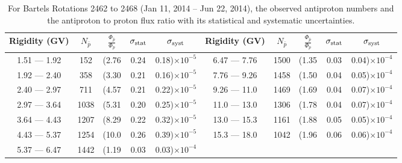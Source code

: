 \begin{table}[p] 
\renewcommand\baselinestretch{1.3}\selectfont
\setlength\tabcolsep{3pt}
\centering
\begin{tabular}{ccccc | ccccc}
\hline
\textbf{Rigidity}  (GV)  & $N_{\bar{p}}$ & $\frac{\Phi_{\bar{p}}}{\Phi_{p}}$ & $\sigma_{\rm{stat}}$ & $\sigma_{\rm{syst}}$ \hspace{1cm}   & \textbf{Rigidity}  (GV)  & $N_{\bar{p}}$ & $\frac{\Phi_{\bar{p}}}{\Phi_{p}}$ & $\sigma_{\rm{stat}}$ & $\sigma_{\rm{syst}}$ \hspace{1cm} \\ 
\hline
1.51 — 1.92   &  152                &(2.76                          &  0.24              &      0.18)$\times 10^{-5}$  & 6.47 — 7.76                &  1500                    &(1.35                                &  0.03                   &      0.04)$\times 10^{-4}$\\
1.92 — 2.40   &  358                &(3.30                          &  0.21              &      0.16)$\times 10^{-5}$  & 7.76 — 9.26                &  1458                    &(1.50                                &  0.04                   &      0.05)$\times 10^{-4}$\\
2.40 — 2.97   &  711                &(4.57                          &  0.21              &      0.22)$\times 10^{-5}$  & 9.26 — 11.0                &  1469                    &(1.69                                &  0.04                   &      0.07)$\times 10^{-4}$\\    
2.97 — 3.64   &  1038              &(5.31                          &  0.20              &      0.25)$\times 10^{-5}$  & 11.0 — 13.0                 &  1306                    &(1.78                                &  0.04                   &      0.07)$\times 10^{-4}$\\    
3.64 — 4.43   &  1207              &(8.29                          &  0.22              &      0.32)$\times 10^{-5}$  & 13.0 — 15.3               &  1161                    &(1.88                                &  0.05                   &      0.05)$\times 10^{-4}$\\
4.43 — 5.37   &  1254              &(10.0                          &  0.26              &      0.39)$\times 10^{-5}$  & 15.3 — 18.0               &  1042                    &(1.96                                &  0.06                   &      0.06)$\times 10^{-4}$\\
5.37 — 6.47   &  1442              &(1.19                          &  0.03              &      0.03)$\times 10^{-4}$  \\
\hline
\end{tabular}
\caption[Antiproton to proton flux ratio for Bartels Rotations 2462 to 2468]{For Bartels Rotations 2462 to 2468 (Jan 11, 2014 – Jun 22, 2014), the observed antiproton numbers and the antiproton to proton flux ratio with its statistical and systematic uncertainties.}
\label{TableOfDependent7}
\end{table}

